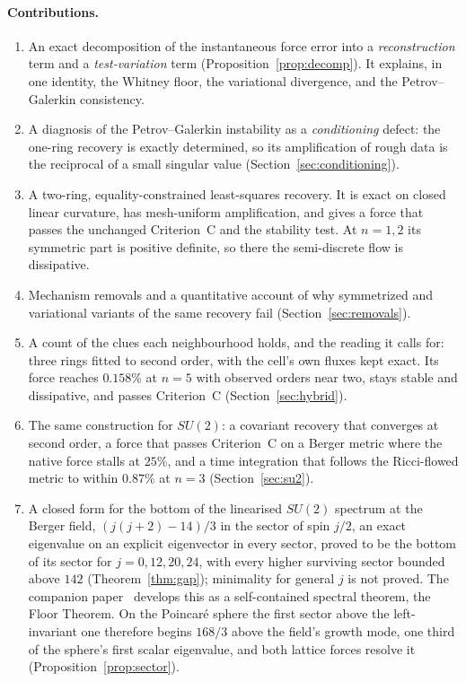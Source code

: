 \documentclass[11pt]{article}
\theoremstyle{definition}
\theoremstyle{remark}
\newcommand{\BW}{Criterion~C}
\begin{document}
\paragraph{Contributions.}
\begin{enumerate}
  \item An exact decomposition of the instantaneous force error into a
    \emph{reconstruction} term and a \emph{test-variation} term
    (Proposition~\ref{prop:decomp}). It explains, in one identity, the Whitney floor, the
    variational divergence, and the Petrov--Galerkin consistency.
  \item A diagnosis of the Petrov--Galerkin instability as a \emph{conditioning} defect:
    the one-ring recovery is exactly determined, so its amplification of rough data is
    the reciprocal of a small singular value (Section~\ref{sec:conditioning}).
  \item A two-ring, equality-constrained least-squares recovery. It is exact on closed
    linear curvature, has mesh-uniform amplification, and gives a force that passes the
    unchanged \BW{} and the stability test. At $n=1,2$ its symmetric part
    is positive definite, so there the semi-discrete flow is dissipative.
  \item Mechanism removals and a quantitative account of why symmetrized and variational
    variants of the same recovery fail (Section~\ref{sec:removals}).
  \item A count of the clues each neighbourhood holds, and the reading it calls for: three
    rings fitted to second order, with the cell's own fluxes kept exact. Its force reaches
    $0.158\%$ at $n=5$ with observed orders near two, stays stable and dissipative, and passes
    \BW{} (Section~\ref{sec:hybrid}).
  \item The same construction for $SU(2)$: a covariant recovery that converges at second
    order, a force that passes \BW{} on a Berger metric where the native force stalls at
    $25\%$, and a time integration that follows the Ricci-flowed metric to within $0.87\%$
    at $n=3$ (Section~\ref{sec:su2}).
  \item A closed form for the bottom of the linearised $SU(2)$ spectrum at the Berger field,
    $(j(j+2)-14)/3$ in the sector of spin $j/2$, an exact eigenvalue on an explicit eigenvector in
    every sector, proved to be the bottom of its sector for $j=0,12,20,24$, with every higher surviving
    sector bounded above $142$ (Theorem~\ref{thm:gap}); minimality for general $j$ is not proved. The
    companion paper~\cite{davisberger} develops this as a self-contained spectral theorem, the Floor
    Theorem. On the Poincar\'e sphere the first sector
    above the left-invariant one therefore begins $168/3$ above the field's growth mode, one third of
    the sphere's first scalar eigenvalue, and both lattice forces resolve it
    (Proposition~\ref{prop:sector}).
\end{enumerate}
\end{document}
